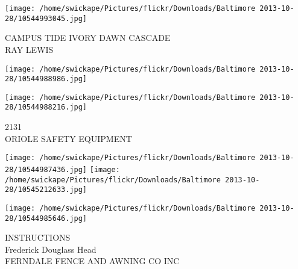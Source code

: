 \documentclass[10pt,letterpaper]{article}
\begin{document}
\vspace{0.25in}
\texttt{[image: /home/swickape/Pictures/flickr/Downloads/Baltimore 2013-10-28/10544993045.jpg]}

CAMPUS TIDE IVORY DAWN CASCADE\\
RAY LEWIS
\pagebreak

\texttt{[image: /home/swickape/Pictures/flickr/Downloads/Baltimore 2013-10-28/10544988986.jpg]}

\vspace{0.25in}
\texttt{[image: /home/swickape/Pictures/flickr/Downloads/Baltimore 2013-10-28/10544988216.jpg]}

2131\\
ORIOLE SAFETY EQUIPMENT
\pagebreak

\texttt{[image: /home/swickape/Pictures/flickr/Downloads/Baltimore 2013-10-28/10544987436.jpg]}
\texttt{[image: /home/swickape/Pictures/flickr/Downloads/Baltimore 2013-10-28/10545212633.jpg]}

\texttt{[image: /home/swickape/Pictures/flickr/Downloads/Baltimore 2013-10-28/10544985646.jpg]}

INSTRUCTIONS\\
Frederick Douglass Head\\
FERNDALE FENCE AND AWNING CO INC
\pagebreak
\end{document}
